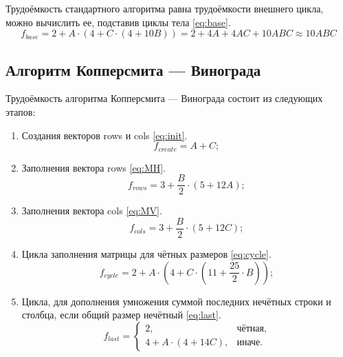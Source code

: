Трудоёмкость стандартного алгоритма равна трудоёмкости внешнего цикла, можно вычислить ее, подставив циклы тела \eqref{eq:base}.
\begin{equation}
    \label{eq:base}
    f_{base} = 2 + A \cdot (4 + C \cdot (4 + 10B)) = 2 + 4A + 4AC + 10ABC \approx 10ABC
\end{equation}

\subsection{Алгоритм Копперсмита — Винограда}

Трудоёмкость алгоритма Копперсмита — Винограда состоит из следующих этапов:

\begin{enumerate}
    \item Создания векторов rows и cols \eqref{eq:init}.
    \begin{equation}
        \label{eq:init}
        f_{create} = A + C;
    \end{equation}

    \item Заполнения вектора rows \eqref{eq:MH}.
    \begin{equation}
        \label{eq:MH}
        f_{rows} = 3 + \frac{B}{2} \cdot (5 + 12A);
    \end{equation}

    \item Заполнения вектора cols \eqref{eq:MV}.
    \begin{equation}
        \label{eq:MV}
        f_{cols} = 3 + \frac{B}{2} \cdot (5 + 12C);
    \end{equation}

    \item Цикла заполнения матрицы для чётных размеров \eqref{eq:cycle}.
    \begin{equation}
        \label{eq:cycle}
        f_{cycle} = 2 + A \cdot (4 + C \cdot (11 + \frac{25}{2} \cdot B));
    \end{equation}

    \item Цикла, для дополнения умножения суммой последних нечётных строки и столбца, если общий размер нечётный \eqref{eq:last}.
    \begin{equation}
        \label{eq:last}
        f_{last} = \begin{cases}
                       2, & \text{чётная,}\\
                       4 + A \cdot (4 + 14C), & \text{иначе.}
        \end{cases}
    \end{equation}
\end{enumerate}

